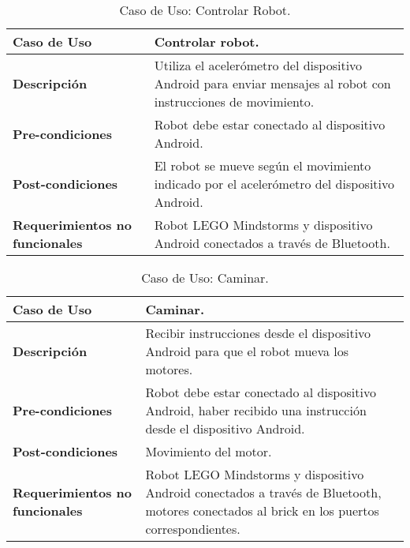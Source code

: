 \begin{table}[htbp!]
  \centering
  \begin{tabular}{|p{4cm}|p{6cm}|}\hline
    \bf{Caso de Uso}   &  Controlar robot.\\ \hline
    \bf{Descripci\'on} &  Utiliza el aceler\'ometro del dispositivo Android para enviar mensajes al robot con instrucciones de movimiento.\\ \hline
    \bf{Pre-condiciones} & Robot debe estar conectado al dispositivo Android. \\ \hline
    \bf{Post-condiciones} &  El robot se mueve seg\'un el movimiento indicado por el aceler\'ometro del dispositivo Android. \\ \hline
    \bf{Requerimientos no funcionales} & Robot LEGO Mindstorms y dispositivo Android conectados a trav\'es de Bluetooth.\\ \hline
  \end{tabular}
  \caption[~Caso de Uso: Controlar Robot]{Caso de Uso: Controlar Robot.}
  \label{table:ControlarRobot}
\end{table}



\begin{table}[htbp!]
  \centering
  \begin{tabular}{|p{4cm}|p{6cm}|}\hline
    \bf{Caso de Uso}  & Caminar. \\ \hline
    \bf{Descripci\'on}  & Recibir instrucciones desde el dispositivo Android para que el robot mueva los motores. \\ \hline
    \bf{Pre-condiciones}  & Robot debe estar conectado al dispositivo Android, haber recibido una instrucci\'on desde el dispositivo Android. \\ \hline
    \bf{Post-condiciones}  & Movimiento del motor. \\ \hline
    \bf{Requerimientos no funcionales} & Robot LEGO Mindstorms y dispositivo Android conectados a trav\'es de Bluetooth, motores conectados al brick en los puertos correspondientes. \\ \hline
  \end{tabular}
  \caption[~Caso de Uso: Caminar]{Caso de Uso: Caminar.}
  \label{table:Caminar}
\end{table}

